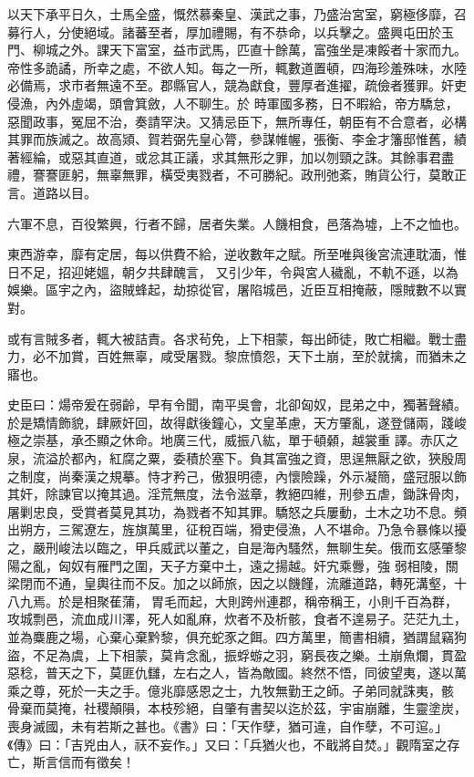 \begin{pinyinscope}
 以天下承平日久，士馬全盛，慨然慕秦皇、漢武之事，乃盛治宮室，窮極侈靡，召募行人，分使絕域。諸蕃至者，厚加禮賜，有不恭命，以兵擊之。盛興屯田於玉門、柳城之外。課天下富室，益市武馬，匹直十餘萬，富強坐是凍餒者十家而九。帝性多詭譎，所幸之處，不欲人知。每之一所，輒數道置頓，四海珍羞殊味，水陸必備焉，求市者無遠不至。郡縣官人，競為獻食，豐厚者進擢，疏儉者獲罪。奸吏侵漁，內外虛竭，頭會箕斂，人不聊生。於
 時軍國多務，日不暇給，帝方驕怠，惡聞政事，冤屈不治，奏請罕決。又猜忌臣下，無所專任，朝臣有不合意者，必構其罪而族滅之。故高熲、賀若弼先皇心膂，參謀帷幄，張衡、李金才籓邸惟舊，績著經綸，或惡其直道，或忿其正議，求其無形之罪，加以刎頸之誅。其餘事君盡禮，謇謇匪躬，無辜無罪，橫受夷戮者，不可勝紀。政刑弛紊，賄貨公行，莫敢正言。道路以目。



 六軍不息，百役繁興，行者不歸，居者失業。人饑相食，邑落為墟，上不之恤也。



 東西游幸，靡有定居，每以供費不給，逆收數年之賦。所至唯與後宮流連耽湎，惟日不足，招迎姥媼，朝夕共肆醜言，
 又引少年，令與宮人穢亂，不軌不遜，以為娛樂。區宇之內，盜賊蜂起，劫掠從官，屠陷城邑，近臣互相掩蔽，隱賊數不以實對。



 或有言賊多者，輒大被詰責。各求茍免，上下相蒙，每出師徒，敗亡相繼。戰士盡力，必不加賞，百姓無辜，咸受屠戮。黎庶憤怨，天下土崩，至於就擒，而猶未之寤也。



 史臣曰：煬帝爰在弱齡，早有令聞，南平吳會，北卻匈奴，昆弟之中，獨著聲績。於是矯情飾貌，肆厥奸回，故得獻後鐘心，文皇革慮，天方肇亂，遂登儲兩，踐峻極之崇基，承丕顯之休命。地廣三代，威振八紘，單于頓顙，越裳重
 譯。赤仄之泉，流溢於都內，紅腐之粟，委積於塞下。負其富強之資，思逞無厭之欲，狹殷周之制度，尚秦漢之規摹。恃才矜己，傲狠明德，內懷險躁，外示凝簡，盛冠服以飾其奸，除諫官以掩其過。淫荒無度，法令滋章，教絕四維，刑參五虐，鋤誅骨肉，屠剿忠良，受賞者莫見其功，為戮者不知其罪。驕怒之兵屢動，土木之功不息。頻出朔方，三駕遼左，旌旗萬里，征稅百端，猾吏侵漁，人不堪命。乃急令暴條以擾之，嚴刑峻法以臨之，甲兵威武以董之，自是海內騷然，無聊生矣。俄而玄感肇黎陽之亂，匈奴有雁門之圍，天子方棄中土，遠之揚越。奸宄乘釁，強
 弱相陵，關梁閉而不通，皇輿往而不反。加之以師旅，因之以饑饉，流離道路，轉死溝壑，十八九焉。於是相聚萑蒲，胃毛而起，大則跨州連郡，稱帝稱王，小則千百為群，攻城剽邑，流血成川澤，死人如亂麻，炊者不及析骸，食者不遑易子。茫茫九土，並為麋鹿之場，心棄心棄黔黎，俱充蛇豕之餌。四方萬里，簡書相續，猶謂鼠竊狗盜，不足為虞，上下相蒙，莫肯念亂，振蜉蝣之羽，窮長夜之樂。土崩魚爛，貫盈惡稔，普天之下，莫匪仇讎，左右之人，皆為敵國。終然不悟，同彼望夷，遂以萬乘之尊，死於一夫之手。億兆靡感恩之士，九牧無勤王之師。子弟同就誅夷，骸
 骨棄而莫掩，社稷顛隕，本枝殄絕，自肇有書契以迄於茲，宇宙崩離，生靈塗炭，喪身滅國，未有若斯之甚也。《書》曰：「天作孽，猶可違，自作孽，不可逭。」《傳》曰：「吉兇由人，祆不妄作。」又曰：「兵猶火也，不戢將自焚。」觀隋室之存亡，斯言信而有徵矣！



\end{pinyinscope}